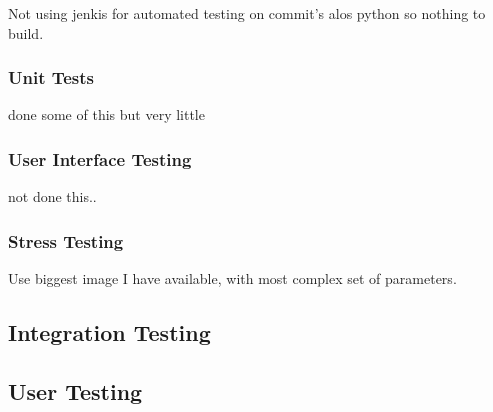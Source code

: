 Not using jenkis for automated testing on commit's alos python so nothing to build.

\subsubsection{Unit Tests}

done some of this but very little

\subsubsection{User Interface Testing}

not done this..

\subsubsection{Stress Testing}

Use biggest image I have available, with most complex set of parameters.

\subsection{Integration Testing}

\subsection{User Testing}

